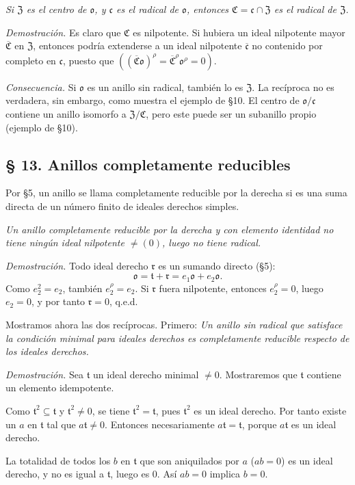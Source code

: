 \documentclass[11pt]{article}
\providecommand{\mC}{\mathfrak{C}}
\providecommand{\mo}{\mathfrak{o}}
\providecommand{\mc}{\mathfrak{c}}
\providecommand{\mr}{\mathfrak{r}}
\providecommand{\mt}{\mathfrak{t}}
\providecommand{\mZ}{\mathfrak{Z}}
\begin{document}
\emph{Si $\mZ$ es el centro de $\mo$, y $\mc$ es el radical de $\mo$, entonces $\mC=\mc\cap\mZ$ es el radical de $\mZ$.}

\emph{Demostración.} Es claro que $\mC$ es nilpotente. Si hubiera un ideal nilpotente mayor $\overline{\mC}$ en $\mZ$, entonces podría extenderse a un ideal nilpotente $\overline{\mc}$ no contenido por completo en $\mc$, puesto que $((\overline{\mC}\mo)^\rho=\overline{\mC}^{\rho}\mo^\rho=0)$.

\emph{Consecuencia.} Si $\mo$ es un anillo sin radical, también lo es $\mZ$. La recíproca no es verdadera, sin embargo, como muestra el ejemplo de §10. El centro de $\mo/\mc$ contiene un anillo isomorfo a $\mZ/\mC$, pero este puede ser un subanillo propio (ejemplo de §10).

\subsection*{§ 13. Anillos completamente reducibles}

Por §5, un anillo se llama completamente reducible por la derecha si es una suma directa de un número finito de ideales derechos simples.

\emph{Un anillo completamente reducible por la derecha y con elemento identidad no tiene ningún ideal nilpotente $\ne(0)$, luego no tiene radical.}

\emph{Demostración.} Todo ideal derecho $\mr$ es un sumando directo (§5):
\[
        \mo=\mt+\mr=e_1\mo+e_2\mo.
\]
Como $e_2^2=e_2$, también $e_2^\rho=e_2$. Si $\mr$ fuera nilpotente, entonces $e_2^\rho=0$, luego $e_2=0$, y por tanto $\mr=0$, q.e.d.

Mostramos ahora las dos recíprocas. Primero: \emph{Un anillo sin radical que satisface la condición minimal para ideales derechos es completamente reducible respecto de los ideales derechos.}

\emph{Demostración.} Sea $\mt$ un ideal derecho minimal $\ne0$. Mostraremos que $\mt$ contiene un elemento idempotente.

Como $\mt^2\subseteq\mt$ y $\mt^2\ne0$, se tiene $\mt^2=\mt$, pues $\mt^2$ es un ideal derecho. Por tanto existe un $a$ en $\mt$ tal que $a\mt\ne0$. Entonces necesariamente $a\mt=\mt$, porque $a\mt$ es un ideal derecho.

La totalidad de todos los $b$ en $\mt$ que son aniquilados por $a$ ($ab=0$) es un ideal derecho, y no es igual a $\mt$, luego es $0$. Así $ab=0$ implica $b=0$.
\end{document}
